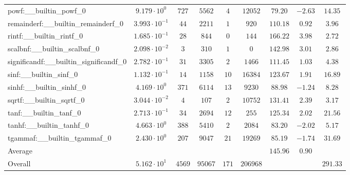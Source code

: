 \begin{tabular}{|l|c|c|c|c|c|c|c|c|}
powf:\_\_builtin\_powf\_0                 & $ 9.179 \cdot 10^{0}  $ & $ 727    $ & $ 5562  $ & $ 4   $ & $ 12052  $ & $ 79.20       $ & $ -2.63   $ & $ 14.35   $ \\
remainderf:\_\_builtin\_remainderf\_0     & $ 3.993 \cdot 10^{-1} $ & $ 44     $ & $ 2211  $ & $ 1   $ & $ 920    $ & $ 110.18      $ & $ 0.92    $ & $ 3.96    $ \\
rintf:\_\_builtin\_rintf\_0               & $ 1.685 \cdot 10^{-1} $ & $ 28     $ & $ 844   $ & $ 0   $ & $ 144    $ & $ 166.22      $ & $ 3.98    $ & $ 2.72    $ \\
scalbnf:\_\_builtin\_scalbnf\_0           & $ 2.098 \cdot 10^{-2} $ & $ 3      $ & $ 310   $ & $ 1   $ & $ 0      $ & $ 142.98      $ & $ 3.01    $ & $ 2.86    $ \\
significandf:\_\_builtin\_significandf\_0 & $ 2.782 \cdot 10^{-1} $ & $ 31     $ & $ 3305  $ & $ 2   $ & $ 1466   $ & $ 111.45      $ & $ 1.03    $ & $ 4.38    $ \\
sinf:\_\_builtin\_sinf\_0                 & $ 1.132 \cdot 10^{-1} $ & $ 14     $ & $ 1158  $ & $ 10  $ & $ 16384  $ & $ 123.67      $ & $ 1.91    $ & $ 16.89   $ \\
sinhf:\_\_builtin\_sinhf\_0               & $ 4.169 \cdot 10^{0}  $ & $ 371    $ & $ 6114  $ & $ 13  $ & $ 9230   $ & $ 88.98       $ & $ -1.24   $ & $ 8.28    $ \\
sqrtf:\_\_builtin\_sqrtf\_0               & $ 3.044 \cdot 10^{-2} $ & $ 4      $ & $ 107   $ & $ 2   $ & $ 10752  $ & $ 131.41      $ & $ 2.39    $ & $ 3.17    $ \\
tanf:\_\_builtin\_tanf\_0                 & $ 2.713 \cdot 10^{-1} $ & $ 34     $ & $ 2694  $ & $ 12  $ & $ 255    $ & $ 125.34      $ & $ 2.02    $ & $ 21.56   $ \\
tanhf:\_\_builtin\_tanhf\_0               & $ 4.663 \cdot 10^{0}  $ & $ 388    $ & $ 5410  $ & $ 2   $ & $ 2084   $ & $ 83.20       $ & $ -2.02   $ & $ 5.17    $ \\
tgammaf:\_\_builtin\_tgammaf\_0           & $ 2.430 \cdot 10^{0}  $ & $ 207    $ & $ 9047  $ & $ 21  $ & $ 19269  $ & $ 85.19       $ & $ -1.74   $ & $ 31.69   $ \\
\hline
Average                                   & $                     $ & $        $ & $       $ & $     $ & $        $ & $ 145.96      $ & $ 0.90    $ & $         $ \\
\hline
Overall                                   & $ 5.162 \cdot 10^{1}  $ & $ 4569   $ & $ 95067 $ & $ 171 $ & $ 206968 $ & $             $ & $         $ & $ 291.33  $ \\
\hline
\end{tabular}
